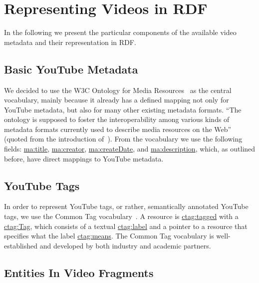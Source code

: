 \documentclass{acm_proc_article-sp}
\begin{document}
\section{Representing Videos in RDF}\label{sec:representing}
In the following we present the particular components of the available video metadata and their representation in RDF.

\subsection{Basic YouTube Metadata}\label{sec:metadata}
We decided to use the W3C Ontology for Media Resources~\cite{W3C:MediaOntology} as the central vocabulary, mainly because it already has a defined mapping not only for YouTube metadata, but also for many other existing metadata formats. ``The ontology is supposed to foster the interoperability among various kinds of metadata formats currently used to describe media resources on the Web'' (quoted from the introduction of~\cite{W3C:MediaOntology}). From the vocabulary we use the following fields: \url{ma:title}, \url{ma:creator}, \url{ma:createDate}, and \url{ma:description}, which, as outlined before, have direct mappings to YouTube metadata. 

\subsection{YouTube Tags}\label{sec:youtube}
In order to represent YouTube tags, or rather, semantically annotated YouTube tags, we use the Common Tag vocabulary~\cite{CommonTag:Spec}. A resource is \url{ctag:tagged} with a \url{ctag:Tag}, which consists of a textual \url{ctag:label} and a pointer to a resource that specifies what the label \url{ctag:means}. The Common Tag vocabulary is well-established and developed by both industry and academic partners.

\subsection{Entities In Video Fragments}
\end{document}
